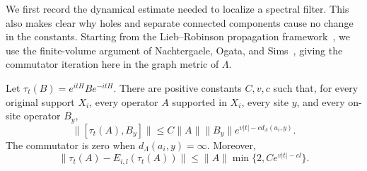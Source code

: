 We first record the dynamical estimate needed to localize a spectral filter.
This also makes clear why holes and separate connected components cause no
change in the constants.  Starting from the Lieb--Robinson
propagation framework~\cite{LiebRobinson1972}, we use the finite-volume
argument of Nachtergaele, Ogata, and Sims~\cite{NachtergaeleOgataSims2006}, giving the
commutator iteration here in the graph metric of $\Lambda$.

\begin{lemma}
\label{lem:quasilocal-lr}
Let $\tau_t(B)=e^{itH}Be^{-itH}$.  There are positive constants $C,v,c$
such that, for every original support $X_i$, every operator $A$ supported
in $X_i$, every site $y$, and every on-site operator $B_y$,
\begin{equation}
 \|[\tau_t(A),B_y]\|
 \le C\|A\|\|B_y\|e^{v|t|-c d_\Lambda(a_i,y)}.
 \label{eq:quasilocal-lr}
\end{equation}
The commutator is zero when $d_\Lambda(a_i,y)=\infty$.  Moreover,
\begin{equation}
 \|\tau_t(A)-E_{i,l}(\tau_t(A))\|
 \le \|A\|\min\{2,Ce^{v|t|-cl}\}.
 \label{eq:quasilocal-lr-ce}
\end{equation}
\end{lemma}

